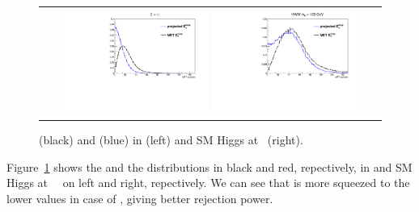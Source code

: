 \begin{figure}[htp] 
\centering 
\begin{tabular}{c} 
\includegraphics[width=0.45\textwidth]{figures/pmet_met_ztt.pdf} 
\includegraphics[width=0.45\textwidth]{figures/pmet_met_hww125.pdf} 
\end{tabular} 
\caption{\met(black) and \pmet(blue) in \dytt{}(left) and SM Higgs at ~\GeV(right).}
\label{fig:projmet} 
\end{figure}  
Figure~\ref{fig:projmet} shows the \met{} and the \pmet{} distributions 
in black and red, repectively, in \dytt{} and SM Higgs at ~\GeV\
on left and right, repectively. We can see that \pmet is more squeezed to 
the lower values in case of \dytt, giving better rejection power.  

